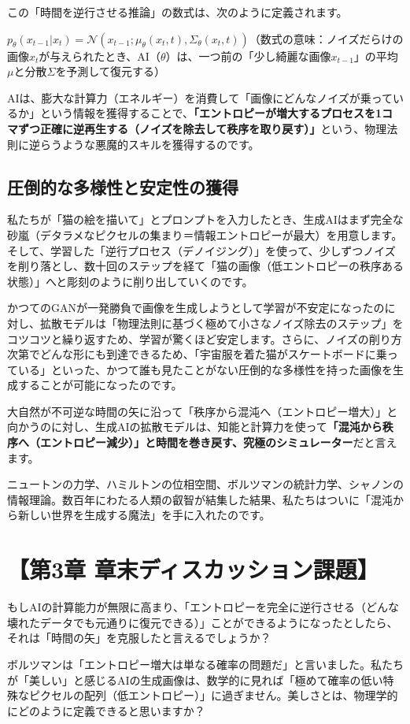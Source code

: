 この「時間を逆行させる推論」の数式は、次のように定義されます。

\(p_\theta(x_{t-1}|x_t)=\mathcal{N}(x_{t-1};\mu_\theta(x_t,t),\Sigma_\theta(x_t,t))\)（数式の意味：ノイズだらけの画像\(x_t\)が与えられたとき、AI（\(\theta\)）は、一つ前の「少し綺麗な画像\(x_{t-1}\)」の平均\(\mu\)と分散\(\Sigma\)を予測して復元する）

AIは、膨大な計算力（エネルギー）を消費して「画像にどんなノイズが乗っているか」という情報を獲得することで、\textbf{「エントロピーが増大するプロセスを1コマずつ正確に逆再生する（ノイズを除去して秩序を取り戻す）」}という、物理法則に逆らうような悪魔的スキルを獲得するのです。

\subsection{圧倒的な多様性と安定性の獲得}

私たちが「猫の絵を描いて」とプロンプトを入力したとき、生成AIはまず完全な砂嵐（デタラメなピクセルの集まり＝情報エントロピーが最大）を用意します。そして、学習した「逆行プロセス（デノイジング）」を使って、少しずつノイズを削り落とし、数十回のステップを経て「猫の画像（低エントロピーの秩序ある状態）」へと彫刻のように削り出していくのです。

かつてのGANが一発勝負で画像を生成しようとして学習が不安定になったのに対し、拡散モデルは「物理法則に基づく極めて小さなノイズ除去のステップ」をコツコツと繰り返すため、学習が驚くほど安定します。さらに、ノイズの削り方次第でどんな形にも到達できるため、「宇宙服を着た猫がスケートボードに乗っている」といった、かつて誰も見たことがない圧倒的な多様性を持った画像を生成することが可能になったのです。

大自然が不可逆な時間の矢に沿って「秩序から混沌へ（エントロピー増大）」と向かうのに対し、生成AIの拡散モデルは、知能と計算力を使って\textbf{「混沌から秩序へ（エントロピー減少）」と時間を巻き戻す、究極のシミュレーター}だと言えます。

ニュートンの力学、ハミルトンの位相空間、ボルツマンの統計力学、シャノンの情報理論。数百年にわたる人類の叡智が結集した結果、私たちはついに「混沌から新しい世界を生成する魔法」を手に入れたのです。

\section*{【第3章 章末ディスカッション課題】}

もしAIの計算能力が無限に高まり、「エントロピーを完全に逆行させる（どんな壊れたデータでも元通りに復元できる）」ことができるようになったとしたら、それは「時間の矢」を克服したと言えるでしょうか？

ボルツマンは「エントロピー増大は単なる確率の問題だ」と言いました。私たちが「美しい」と感じるAIの生成画像は、数学的に見れば「極めて確率の低い特殊なピクセルの配列（低エントロピー）」に過ぎません。美しさとは、物理学的にどのように定義できると思いますか？




